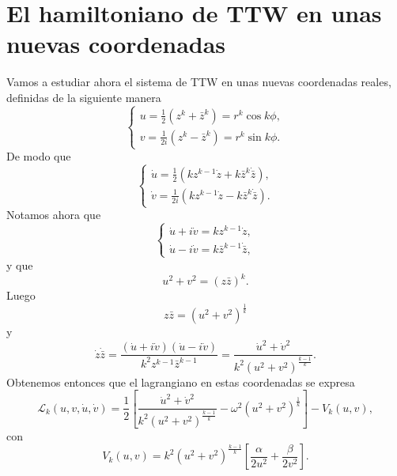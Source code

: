\documentclass[12pt,a4paper,twoside]{article}
\theoremstyle{definition} \newtheorem{defn}[thm]{Definición}
\theoremstyle{definition} \newtheorem{ejemplo}[thm]{Ejemplo}
\theoremstyle{definition} \newtheorem{ejercicio}[thm]{Ejercicio}
\theoremstyle{remark} \newtheorem*{obs}{Observación}
\def\zz{\bar{z}}
\begin{document}
\section{El hamiltoniano de TTW en unas nuevas coordenadas}
Vamos a estudiar ahora el sistema de TTW en unas nuevas coordenadas reales, definidas de la siguiente manera
\begin{equation}
  \begin{cases}
    u=\tfrac{1}{2}(z^k+\zz^k)=r^k\cos k\phi, \\
    v=\tfrac{1}{2i}(z^k-\zz^k)=r^k \sin k\phi.
  \end{cases}
\end{equation}
De modo que
\begin{equation}
  \begin{cases}
    \dot{u}=\tfrac{1}{2}(kz^{k-1}\dot{z}+k\zz^k\dot{\zz}),\\
    \dot{v}=\tfrac{1}{2i}(kz^{k-1}\dot{z}-k\zz^k\dot{\zz}).
  \end{cases}
\end{equation}
Notamos ahora que 
\begin{equation*}
  \begin{cases}
    \dot{u}+i\dot{v}=kz^{k-1}\dot{z},\\
    \dot{u}-i\dot{v}=k\zz^{k-1}\dot{\zz},
  \end{cases}
\end{equation*}
y que
\begin{equation*}
  u^2+v^2=(z\zz)^k.
\end{equation*}
Luego
\begin{equation*}
  z\zz=(u^2+v^2)^{\frac{1}{k}}
\end{equation*}
y
\begin{equation*}
    \dot{z}\dot{\zz}=\frac{(\dot{u}+i\dot{v})(\dot{u}-i\dot{v})}{k^2z^{k-1}\zz^{k-1}}=\frac{\dot{u}^2+\dot{v}^2}{k^2(u^2+v^2)^{\frac{k-1}{k}}}.
\end{equation*}
Obtenemos entonces que el lagrangiano en estas coordenadas se expresa
\begin{equation}
  \mathcal{L}_k(u,v,\dot{u},\dot{v})=\frac{1}{2}\left[ \frac{\dot{u}^2+\dot{v}^2}{k^2(u^2+v^2)^{\frac{k-1}{k}}} -\omega^2(u^2+v^2)^{\frac{1}{k}}\right]-V_k(u,v),
\end{equation}
con
\begin{equation}
  V_k(u,v)=k^2(u^2+v^2)^{\frac{k-1}{k}}\left[ \frac{\alpha}{2u^2}+\frac{\beta}{2v^2} \right].
\end{equation}
\end{document}
